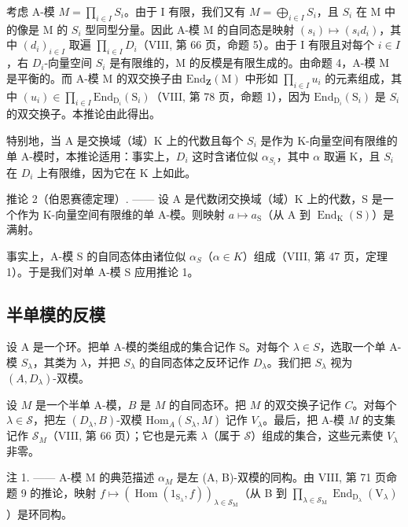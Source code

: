 考虑 A-模 \(M = \prod_{i \in I} S_i\)。由于 I 有限，我们又有 \(M = \bigoplus_{i \in I} S_i\)，且 \(S_i\) 在 M 中的像是 M 的 \(S_i\) 型同型分量。因此 A-模 M 的自同态是映射 \((s_i) \mapsto (s_i d_i)\)，其中 \((d_i)_{i \in I}\) 取遍 \(\prod_{i \in I} D_i\)（VIII, 第 66 页，命题 5）。由于 I 有限且对每个 \(i \in I\)，右 \(D_i\)-向量空间 \(S_i\) 是有限维的，M 的反模是有限生成的。由命题 4，A-模 M 是平衡的。而 A-模 M 的双交换子由 \(\text{End}_{\mathbf{Z}}(\text{M})\) 中形如 \(\prod_{i \in I} u_i\) 的元素组成，其中 \((u_i) \in \prod_{i \in I} \text{End}_{\text{D}_i}(\text{S}_i)\)（VIII, 第 78 页，命题 1），因为 \(\text{End}_{\text{D}_i}(\text{S}_i)\) 是 \(S_i\) 的双交换子。本推论由此得出。

特别地，当 A 是交换域（域）K 上的代数且每个 \(S_{i}\) 是作为 K-向量空间有限维的单 A-模时，本推论适用：事实上，\(D_{i}\) 这时含诸位似 \(\alpha_{S_{i}}\)，其中 \(\alpha\) 取遍 K，且 \(S_{i}\) 在 \(D_{i}\) 上有限维，因为它在 K 上如此。

推论 2（伯恩赛德定理）. —— 设 A 是代数闭交换域（域）K 上的代数，S 是一个作为 K-向量空间有限维的单 A-模。则映射 \(a \mapsto a_{\mathrm{S}}\)（从 A 到 \(\operatorname{End}_{\mathrm{K}}(\mathrm{S})\)）是满射。

事实上，A-模 S 的自同态体由诸位似 \(\alpha_{S}\)（\(\alpha \in K\)）组成（VIII, 第 47 页，定理 1）。于是我们对单 A-模 S 应用推论 1。

\subsection{半单模的反模}

设 A 是一个环。把单 A-模的类组成的集合记作 S。对每个 \(\lambda \in S\)，选取一个单 A-模 \(S_{\lambda}\)，其类为 \(\lambda\)，并把 \(S_{\lambda}\) 的自同态体之反环记作 \(D_{\lambda}\)。我们把 \(S_{\lambda}\) 视为 \((A, D_{\lambda})\)-双模。

设 \(M\) 是一个半单 A-模，\(B\) 是 \(M\) 的自同态环。把 \(M\) 的双交换子记作 \(C\)。对每个 \(\lambda \in \mathcal{S}\)，把左 \((D_{\lambda}, B)\)-双模 \(\mathrm{Hom}_A(S_{\lambda}, M)\) 记作 \(V_{\lambda}\)。最后，把 A-模 \(M\) 的支集记作 \(\mathcal{S}_M\)（VIII, 第 66 页）；它也是元素 \(\lambda\)（属于 \(\mathcal{S}\)）组成的集合，这些元素使 \(V_{\lambda}\) 非零。

注 1. —— A-模 M 的典范描述 \(\alpha_{M}\) 是左 (A, B)-双模的同构。由 VIII, 第 71 页命题 9 的推论，映射 \(f \mapsto (\operatorname{Hom}(1_{\mathrm{S}_{\lambda}}, f))_{\lambda \in \mathcal{S}_{\mathrm{M}}}\)（从 B 到 \(\prod_{\lambda \in \mathcal{S}_{\mathrm{M}}} \operatorname{End}_{\mathrm{D}_{\lambda}}(\mathrm{V}_{\lambda})\)）是环同构。

